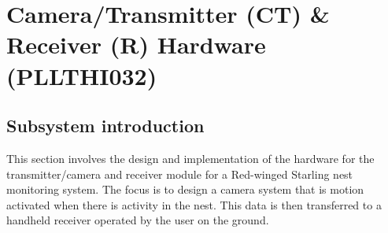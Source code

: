 \documentclass[class=report,11pt,crop=false]{standalone}
\begin{document}
\ifstandalone
\tableofcontents
\fi
\chapter{Camera/Transmitter (CT) \& Receiver (R) Hardware (PLLTHI032)\label{ch:hardware}}


\section{Subsystem introduction}
This section involves the design and implementation of the hardware for the transmitter/camera and receiver module for a Red-winged Starling nest monitoring system. The focus is to design a camera system that is motion activated when there is activity in the nest. This data is then transferred to a handheld receiver operated by the user on the ground. 
\end{document}
